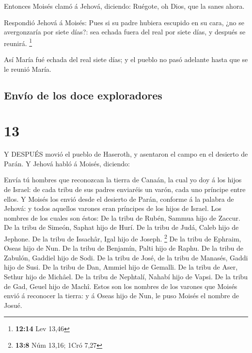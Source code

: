  Entonces Moisés clamó á Jehová, diciendo: Ruégote, oh
Dios, que la sanes ahora.

 Respondió Jehová á Moisés: Pues si su padre hubiera
escupido en su cara, ¿no se avergonzaría por siete días?: sea echada
fuera del real por siete días, y después se reunirá. \footnote{\textbf{12:14}
  Lev 13,46}

 Así María fué echada del real siete días; y el pueblo no
pasó adelante hasta que se le reunió María. 

\hypertarget{envuxedo-de-los-doce-exploradores}{%
\subsection{Envío de los doce
exploradores}\label{envuxedo-de-los-doce-exploradores}}

\hypertarget{section-12}{%
\section{13}\label{section-12}}

 Y DESPUÉS movió el pueblo de Haseroth, y asentaron el campo
en el desierto de Parán.  Y Jehová habló á Moisés, diciendo:

 Envía tú hombres que reconozcan la tierra de Canaán, la
cual yo doy á los hijos de Israel: de cada tribu de sus padres enviaréis
un varón, cada uno príncipe entre ellos.  Y Moisés los envió
desde el desierto de Parán, conforme á la palabra de Jehová: y todos
aquellos varones eran príncipes de los hijos de Israel.  Los
nombres de los cuales son éstos: De la tribu de Rubén, Sammua hijo de
Zaccur.  De la tribu de Simeón, Saphat hijo de Hurí.
 De la tribu de Judá, Caleb hijo de Jephone.  De
la tribu de Issachâr, Igal hijo de Joseph. \footnote{\textbf{13:8} Núm
  13,16; 1Cró 7,27}  De la tribu de Ephraim, Oseas hijo de
Nun.  De la tribu de Benjamín, Palti hijo de Raphu.
 De la tribu de Zabulón, Gaddiel hijo de Sodi.
 De la tribu de José, de la tribu de Manasés, Gaddi hijo de
Susi.  De la tribu de Dan, Ammiel hijo de Gemalli.
 De la tribu de Aser, Sethur hijo de Michâel. 
De la tribu de Nephtalí, Nahabí hijo de Vapsi.  De la tribu
de Gad, Geuel hijo de Machî.  Estos son los nombres de los
varones que Moisés envió á reconocer la tierra: y á Oseas hijo de Nun,
le puso Moisés el nombre de Josué.

